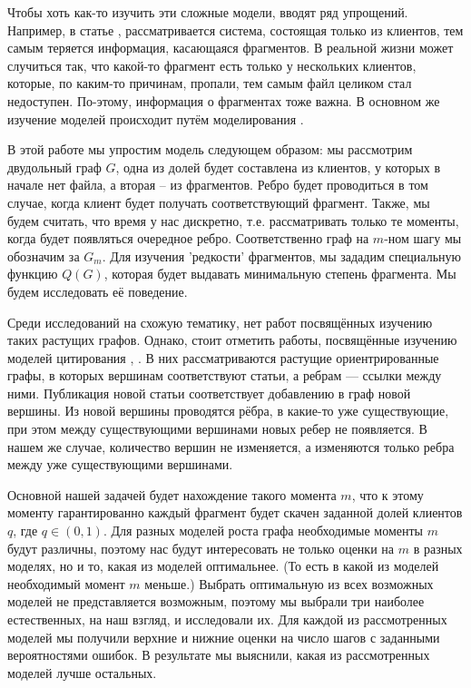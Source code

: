 \documentclass{matmex-diploma-custom}
\theoremstyle{named}
\begin{document}
Чтобы хоть как-то изучить эти сложные модели, вводят ряд упрощений.
Например, в статье \cite{cool}, рассматривается система, состоящая только из клиентов, 
тем самым теряется информация, касающаяся фрагментов.
В реальной жизни может случиться так, что какой-то фрагмент есть только у нескольких клиентов, которые, 
по каким-то причинам, пропали, тем самым файл целиком стал недоступен.
По-этому, информация о фрагментах тоже важна. 
В основном же изучение моделей происходит путём моделирования \cite{unavalib}.


В этой работе мы упростим модель следующем образом: мы рассмотрим двудольный граф $G$, 
одна из долей будет составлена из клиентов, у которых в начале нет файла, а вторая -- из фрагментов. 
Ребро будет проводиться в том случае, когда клиент будет получать соответствующий фрагмент.
Также, мы будем считать, что время у нас дискретно, т.е. рассматривать только те моменты, когда будет появляться очередное ребро.
Соответственно граф на $m$-ном шагу мы обозначим за $G_m$.
Для изучения 'редкости' фрагментов, мы зададим специальную функцию $Q(G)$, которая будет выдавать минимальную степень фрагмента.
Мы будем исследовать её поведение.

Среди исследований на схожую тематику, нет работ посвящённых изучению таких растущих графов.
Однако, стоит отметить работы, посвящённые изучению моделей цитирования \cite{price}, \cite{newman}. 
В них рассматриваются растущие ориентрированные графы, в которых вершинам соответствуют статьи, а ребрам --- ссылки между ними. 
Публикация новой статьи соответствует добавлению в граф новой вершины.
Из новой вершины проводятся рёбра, в какие-то уже существующие, при этом между существующими вершинами новых ребер не появляется.
В нашем же случае, количество вершин не изменяется, а изменяются только ребра между уже существующими вершинами.

Основной нашей задачей будет нахождение такого момента $m$, что к этому моменту гарантированно каждый фрагмент 
будет скачен заданной долей клиентов $q$, где $q \in (0, 1)$. 
Для разных моделей роста графа необходимые моменты $m$ будут различны, 
поэтому нас будут интересовать не только оценки на $m$ в разных моделях, но и то, какая из моделей оптимальнее. 
(То есть в какой из моделей необходимый момент $m$ меньше.) 
Выбрать оптимальную из всех возможных моделей не представляется возможным, 
поэтому мы выбрали три наиболее естественных, на наш взгляд, и исследовали их. 
Для каждой из рассмотренных моделей мы получили верхние и нижние оценки на число шагов с заданными вероятностями ошибок. 
В результате мы выяснили, какая из рассмотренных моделей лучше остальных.
\end{document}
